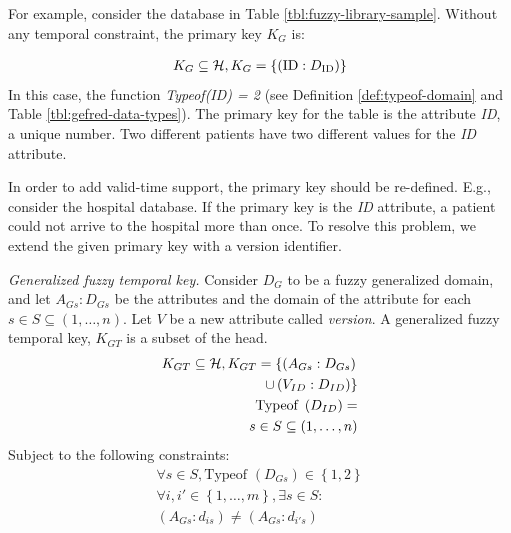 For example, consider the database in Table \ref{tbl:fuzzy-library-sample}. Without any temporal constraint, the primary key $K_G$ is:

\begin{align}
\nonumber
K_G \subseteq \mathcal{H}, K_G = \left \lbrace  \left(\text{ID}:D_{\text{ID}} \right) \right \rbrace
\end{align}
In this case, the function \emph{Typeof(ID) = 2} (see Definition \ref{def:typeof-domain} and Table \ref{tbl:gefred-data-types}). The primary key for the table is the attribute \emph{ID}, a unique number. Two different patients have two different values for the \emph{ID} attribute.

In order to add valid-time support, the primary key should be re-defined. E.g., consider the hospital database. If the primary key is the \emph{ID} attribute, a patient could not arrive to the hospital more than once. To resolve this problem, we extend the given primary key with a version identifier. 




\begin{definition}
\label{def:generalized-fuzzy-temporal-key}
\emph{Generalized fuzzy temporal key.}
Consider $D_G$ to be a fuzzy generalized domain, and let $A_{Gs}:D_{Gs}$ be the attributes and the domain of the attribute for each $s \in S \subseteq \left(1, \ldots, n \right)$. Let  $V$ be a new attribute called \emph{version}. 
A generalized fuzzy temporal key, $K_{GT}$ is a subset of the head.
\begin{align}
\label{eq:generalized-fuzzy-temporal-key}
K_{GT} \subseteq \mathcal{H}, K_{GT} = \left \lbrace  \left(A_{Gs}:D_{Gs} \right) \right.  \\
\nonumber
 \left. \cup  \left(V_{ID}:D_{ID} \right)	\right \rbrace \\
\nonumber
\text{Typeof }\left(D_{ID} \right) = \\
\nonumber
s\in S \subseteq \left(1, \ldots, n \right) \\
\end{align}
Subject to the following constraints:
\begin{align}
\forall s \in S, \text{Typeof } \left(D_{Gs} \right) \in \left \lbrace 1, 2 \right \rbrace \\
\nonumber
\forall i, i' \in \left \lbrace 1, \ldots, m\right \rbrace , \exists s \in S: \\
\nonumber
\left(A_{Gs}:d_{is} \right) \neq \left(A_{Gs}:d_{i's} \right)
\end{align}
\end{definition}

